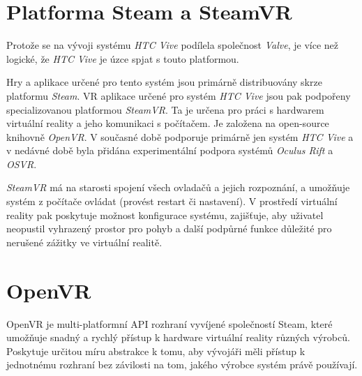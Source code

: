 \newpage

\section{Platforma Steam a SteamVR}\label{platforma-steam-a-steamvr}

Protože se na vývoji systému \emph{HTC Vive} podílela společnost
\emph{Valve}, je více než logické, že \emph{HTC Vive} je úzce spjat s
touto platformou.

Hry a aplikace určené pro tento systém jsou primárně distribuovány skrze
platformu \emph{Steam}. VR aplikace určené pro systém \emph{HTC Vive}
jsou pak podpořeny specializovanou platformou \emph{SteamVR}. Ta je
určena pro práci s hardwarem virtuální reality a jeho komunikaci s
počítačem. Je založena na open-source knihovně \emph{OpenVR}. V současné
době podporuje primárně jen systém \emph{HTC Vive} a v nedávné době byla
přidána experimentální podpora systémů \emph{Oculus Rift} a \emph{OSVR}. \autocite{steamvrsupports}

\emph{SteamVR} má na starosti spojení všech ovladačů a jejich
rozpoznání, a umožňuje systém z počítače ovládat (provést restart či
nastavení). V prostředí virtuální reality pak poskytuje možnost
konfigurace systému, zajišťuje, aby uživatel neopustil vyhrazený prostor
pro pohyb a další podpůrné funkce důležité pro nerušené zážitky ve
virtuální realitě.

\section{OpenVR}\label{openvr}

OpenVR je multi-platformní API rozhraní vyvíjené společností Steam,
které umožňuje snadný a rychlý přístup k hardware virtuální reality
různých výrobců. Poskytuje určitou míru abstrakce k tomu, aby vývojáři
měli přístup k jednotnému rozhraní bez závilosti na tom, jakého výrobce
systém právě používají.
